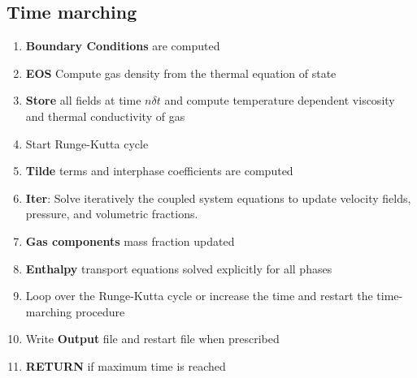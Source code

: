 \subsection{Time marching}
\begin{enumerate}
\item {\bf Boundary Conditions} are computed
\item {\bf EOS} Compute gas density from the thermal equation of state
\item {\bf Store} all fields at time $n\delta t$ and
compute temperature dependent viscosity and thermal conductivity of gas
\item Start Runge-Kutta cycle
\item {\bf Tilde} terms and interphase coefficients are computed
\item {\bf Iter}: Solve iteratively the coupled system equations to update velocity fields,
pressure, and volumetric fractions.
\item {\bf Gas components} mass fraction updated
\item {\bf Enthalpy} transport equations solved explicitly for all phases
\item Loop over the Runge-Kutta cycle or increase the time and restart the time-marching procedure
\item Write {\bf Output} file and restart file when prescribed
\item {\bf RETURN} if maximum time is reached
\end{enumerate}
\clearpage

